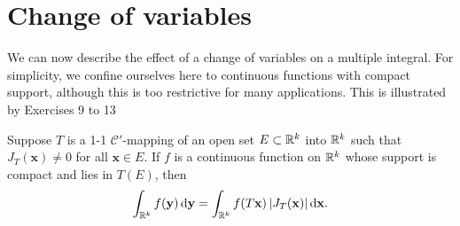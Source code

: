 \section{Change of variables}

We can now describe the effect of a change of variables on a multiple integral.
For simplicity, we confine ourselves here to continuous functions with compact
support, although this is too restrictive for many applications. This is illustrated
by Exercises 9 to 13

\begin{thm}
    \label{thm:10.9}
    Suppose $T$ is a 1-1 $\mathscr{C}'$-mapping of an open set $E \subset {\protect\mathbb R}^k$ into ${\protect\mathbb R}^k$ 
    such that $J_T(\mathbf{x}) \neq 0$ for all $\mathbf{x} \in E$. 
    If $f$ is a continuous function on ${\protect\mathbb R}^k$ whose support is compact and lies in $T(E)$, then
    \begin{equation}
        \label{eq:10.31}
        \int_{\R^k} f(\mathbf{y}) \d \mathbf{y} = 
        \int_{\R^k} f(T \mathbf{x}) \left| J_T(\mathbf{x}) \right| \d \mathbf{x} .
    \end{equation}
\end{thm}



